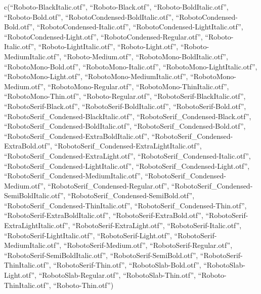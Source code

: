 \documentclass[
]{article}
\newenvironment{Shaded}{\begin{snugshade}}{\end{snugshade}}
\newcommand{\AttributeTok}[1]{\textcolor[rgb]{0.13,0.29,0.53}{#1}}
\newcommand{\ConstantTok}[1]{\textcolor[rgb]{0.56,0.35,0.01}{#1}}
\newcommand{\ControlFlowTok}[1]{\textcolor[rgb]{0.13,0.29,0.53}{\textbf{#1}}}
\newcommand{\DecValTok}[1]{\textcolor[rgb]{0.00,0.00,0.81}{#1}}
\newcommand{\FunctionTok}[1]{\textcolor[rgb]{0.13,0.29,0.53}{\textbf{#1}}}
\newcommand{\NormalTok}[1]{#1}
\newcommand{\SpecialCharTok}[1]{\textcolor[rgb]{0.81,0.36,0.00}{\textbf{#1}}}
\newcommand{\StringTok}[1]{\textcolor[rgb]{0.31,0.60,0.02}{#1}}
\begin{document}
\begin{Shaded}
\end{Shaded}

c(``Roboto-BlackItalic.otf'', ``Roboto-Black.otf'',
``Roboto-BoldItalic.otf'', ``Roboto-Bold.otf'',
``RobotoCondensed-BoldItalic.otf'', ``RobotoCondensed-Bold.otf'',
``RobotoCondensed-Italic.otf'', ``RobotoCondensed-LightItalic.otf'',
``RobotoCondensed-Light.otf'', ``RobotoCondensed-Regular.otf'',
``Roboto-Italic.otf'', ``Roboto-LightItalic.otf'', ``Roboto-Light.otf'',
``Roboto-MediumItalic.otf'', ``Roboto-Medium.otf'',
``RobotoMono-BoldItalic.otf'', ``RobotoMono-Bold.otf'',
``RobotoMono-Italic.otf'', ``RobotoMono-LightItalic.otf'',
``RobotoMono-Light.otf'', ``RobotoMono-MediumItalic.otf'',
``RobotoMono-Medium.otf'', ``RobotoMono-Regular.otf'',
``RobotoMono-ThinItalic.otf'', ``RobotoMono-Thin.otf'',
``Roboto-Regular.otf'', ``RobotoSerif-BlackItalic.otf'',
``RobotoSerif-Black.otf'', ``RobotoSerif-BoldItalic.otf'',
``RobotoSerif-Bold.otf'', ``RobotoSerif\_Condensed-BlackItalic.otf'',
``RobotoSerif\_Condensed-Black.otf'',
``RobotoSerif\_Condensed-BoldItalic.otf'',
``RobotoSerif\_Condensed-Bold.otf'',
``RobotoSerif\_Condensed-ExtraBoldItalic.otf'',
``RobotoSerif\_Condensed-ExtraBold.otf'',
``RobotoSerif\_Condensed-ExtraLightItalic.otf'',
``RobotoSerif\_Condensed-ExtraLight.otf'',
``RobotoSerif\_Condensed-Italic.otf'',
``RobotoSerif\_Condensed-LightItalic.otf'',
``RobotoSerif\_Condensed-Light.otf'',
``RobotoSerif\_Condensed-MediumItalic.otf'',
``RobotoSerif\_Condensed-Medium.otf'',
``RobotoSerif\_Condensed-Regular.otf'',
``RobotoSerif\_Condensed-SemiBoldItalic.otf'',
``RobotoSerif\_Condensed-SemiBold.otf'',
``RobotoSerif\_Condensed-ThinItalic.otf'',
``RobotoSerif\_Condensed-Thin.otf'',
``RobotoSerif-ExtraBoldItalic.otf'', ``RobotoSerif-ExtraBold.otf'',
``RobotoSerif-ExtraLightItalic.otf'', ``RobotoSerif-ExtraLight.otf'',
``RobotoSerif-Italic.otf'', ``RobotoSerif-LightItalic.otf'',
``RobotoSerif-Light.otf'', ``RobotoSerif-MediumItalic.otf'',
``RobotoSerif-Medium.otf'', ``RobotoSerif-Regular.otf'',
``RobotoSerif-SemiBoldItalic.otf'', ``RobotoSerif-SemiBold.otf'',
``RobotoSerif-ThinItalic.otf'', ``RobotoSerif-Thin.otf'',
``RobotoSlab-Bold.otf'', ``RobotoSlab-Light.otf'',
``RobotoSlab-Regular.otf'', ``RobotoSlab-Thin.otf'',
``Roboto-ThinItalic.otf'', ``Roboto-Thin.otf'')
\end{document}

